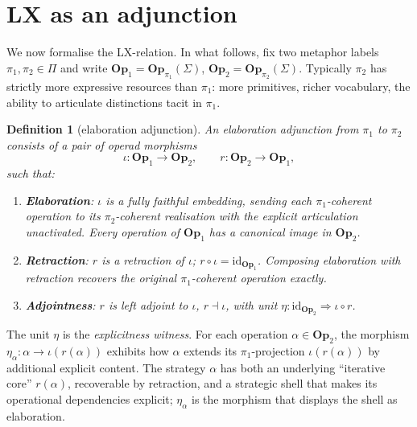 \documentclass[11pt]{article}
\newtheorem{definition}{Definition}
\begin{document}
\section{LX as an adjunction}\label{sec:lx-adjunction}

We now formalise the LX-relation. In what follows, fix two metaphor
labels $\pi_1, \pi_2 \in \Pi$ and write $\mathbf{Op}_1 =
\mathbf{Op}_{\pi_1}(\Sigma)$, $\mathbf{Op}_2 =
\mathbf{Op}_{\pi_2}(\Sigma)$. Typically $\pi_2$ has strictly more
expressive resources than $\pi_1$: more primitives, richer
vocabulary, the ability to articulate distinctions tacit in $\pi_1$.

\begin{definition}[elaboration adjunction]\label{def:lx}
An \emph{elaboration adjunction} from $\pi_1$ to $\pi_2$ consists of a pair of
operad morphisms
\[
\iota : \mathbf{Op}_1 \longrightarrow \mathbf{Op}_2,
\qquad
r : \mathbf{Op}_2 \longrightarrow \mathbf{Op}_1,
\]
such that:
\begin{enumerate}[noitemsep,topsep=2pt,label=(LX\arabic*)]
  \item \textbf{Elaboration}: $\iota$ is a fully faithful embedding,
        sending each $\pi_1$-coherent operation to its
        $\pi_2$-coherent realisation with the explicit articulation
        unactivated. Every operation of $\mathbf{Op}_1$ has a
        canonical image in $\mathbf{Op}_2$.
  \item \textbf{Retraction}: $r$ is a retraction of $\iota$;
        $r \circ \iota = \mathrm{id}_{\mathbf{Op}_1}$. Composing
        elaboration with retraction recovers the original
        $\pi_1$-coherent operation exactly.
  \item \textbf{Adjointness}: $r$ is left adjoint to $\iota$,
        $r \dashv \iota$, with unit
        $\eta : \mathrm{id}_{\mathbf{Op}_2} \Rightarrow \iota \circ r$.
\end{enumerate}
\end{definition}

The unit $\eta$ is the \emph{explicitness witness}. For each
operation $\alpha \in \mathbf{Op}_2$, the morphism
$\eta_\alpha : \alpha \to \iota(r(\alpha))$ exhibits how $\alpha$
extends its $\pi_1$-projection $\iota(r(\alpha))$ by additional
explicit content. The strategy $\alpha$ has both an underlying
``iterative core'' $r(\alpha)$, recoverable by retraction, and a
strategic shell that makes its operational dependencies explicit;
$\eta_\alpha$ is the morphism that displays the shell as elaboration.
\end{document}
